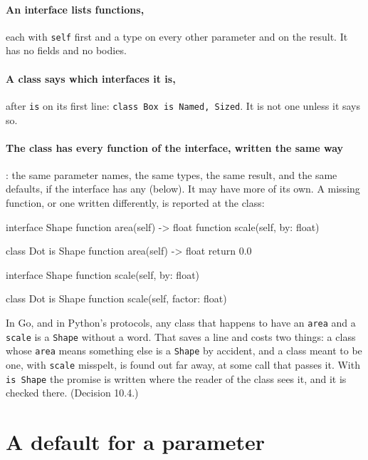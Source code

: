 \paragraph{An interface lists functions,} each with \verb|self| first
and a type on every other parameter and on the result. It has no
fields and no bodies.

\paragraph{A class says which interfaces it is,} after \verb|is| on
its first line: \verb|class Box is Named, Sized|. It is not one unless
it says so.

\paragraph{The class has every function of the interface, written the
same way}: the same parameter names, the same types, the same result,
and the same defaults, if the interface has any (below).
It may have more of its own. A missing function, or one written
differently, is reported at the class:

\begin{zeno}[fails=yes]
interface Shape {
    function area(self) -> float
    function scale(self, by: float)
}

class Dot is Shape {
    function area(self) -> float {
        return 0.0
    }
}
\end{zeno}

\begin{zeno}[fails=yes]
interface Shape {
    function scale(self, by: float)
}

class Dot is Shape {
    function scale(self, factor: float) {
    }
}
\end{zeno}

\begin{why}
In Go, and in Python's protocols, any class that happens to have an
\verb|area| and a \verb|scale| is a \verb|Shape| without a word. That
saves a line and costs two things: a class whose \verb|area| means
something else is a \verb|Shape| by accident, and a class meant to be
one, with \verb|scale| misspelt, is found out far away, at some call
that passes it. With \verb|is Shape| the promise is written where the
reader of the class sees it, and it is checked there. (Decision 10.4.)
\end{why}

\section{A default for a parameter}

